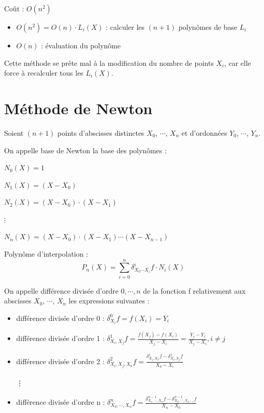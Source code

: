 Coût : $O(n^2)$
\begin{itemize}
\item $O(n^2) = O(n) \cdot L_i(X)$ : calculer les $(n + 1)$ polynômes de base $L_i$
\item $O(n)$ : évaluation du polynôme
\end{itemize}

\bigbreak
Cette méthode se prête mal à la modification du nombre de points $X_i$, car elle force à recalculer tous les $L_i(X)$.


\newpage

\section {Méthode de Newton}

Soient $(n + 1)$ points d'abscisses distinctes $X_0$, $\cdots$, $X_n$ et d'ordonnées $Y_0$, $\cdots$, $Y_n$.

\begin{fdef}
On appelle base de Newton la base des polynômes :

$N_0(X) = 1$

$N_1(X) = (X - X_0)$

$N_2(X) = (X - X_0) \cdot (X - X_1)$

$\vdots$

$N_n(X) = (X - X_0) \cdot (X - X_1) \cdots (X - X_{n - 1})$
\end{fdef}


Polynôme d'interpolation :
\begin{equation}
    P_n(X) = \sum_{i = 0}^n \delta_{X_0 \cdots X_i}^i f \cdot N_i(X)
\end{equation}


On appelle différence divisée d'ordre $0, \cdots, n$ de la fonction f relativement aux abscisses $X_0$, $\cdots$, $X_n$ les expressions suivantes :

\begin{itemize}
\item différence divisée d'ordre 0 : $\delta_{X_i}^0 f = f(X_i) = Y_i$
\item différence divisée d'ordre 1 : $\delta_{X_i,X_j}^1 f = \frac{f(X_j) - f(X_i)}{X_j - X_i} = \frac{Y_j - Y_i}{X_j - X_i}, i \ne j$
\item différence divisée d'ordre 2 : $\delta_{X_i,X_j,X_k}^2 f = \frac{\delta_{X_j,X_k}^1 f - \delta_{X_i,X_j}^1 f}{X_k - X_i}$
\\
\\
\vdots
\item différence divisée d'ordre n : $\delta_{X_0,\cdots,X_n}^n f = \frac{\delta_{X_1,\cdots,X_n}^{n - 1} f - \delta_{X_0,\cdots,X_{n - 1}}^{n - 1} f}{X_n - X_0}$
\end{itemize}

